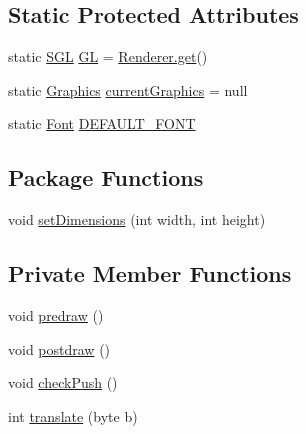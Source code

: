 \subsection*{Static Protected Attributes}
\begin{DoxyCompactItemize}
\item 
static \mbox{\hyperlink{interfaceorg_1_1newdawn_1_1slick_1_1opengl_1_1renderer_1_1_s_g_l}{S\+GL}} \mbox{\hyperlink{classorg_1_1newdawn_1_1slick_1_1_graphics_a39ca68db81b225982a4421c4a6835eed}{GL}} = \mbox{\hyperlink{classorg_1_1newdawn_1_1slick_1_1opengl_1_1renderer_1_1_renderer_abe742c3a7dfca67c6c01821d27087308}{Renderer.\+get}}()
\item 
static \mbox{\hyperlink{classorg_1_1newdawn_1_1slick_1_1_graphics}{Graphics}} \mbox{\hyperlink{classorg_1_1newdawn_1_1slick_1_1_graphics_aededc15e0b8a4b7f0b9b6dc9ba263251}{current\+Graphics}} = null
\item 
static \mbox{\hyperlink{interfaceorg_1_1newdawn_1_1slick_1_1_font}{Font}} \mbox{\hyperlink{classorg_1_1newdawn_1_1slick_1_1_graphics_a5012bdee04bc821457bcc5fdcd23c5c6}{D\+E\+F\+A\+U\+L\+T\+\_\+\+F\+O\+NT}}
\end{DoxyCompactItemize}
\subsection*{Package Functions}
\begin{DoxyCompactItemize}
\item 
void \mbox{\hyperlink{classorg_1_1newdawn_1_1slick_1_1_graphics_a0e154c1ece7603367974df28f2e38a62}{set\+Dimensions}} (int width, int height)
\end{DoxyCompactItemize}
\subsection*{Private Member Functions}
\begin{DoxyCompactItemize}
\item 
void \mbox{\hyperlink{classorg_1_1newdawn_1_1slick_1_1_graphics_a7b4c203181e3b6302d51ed9b24596b8d}{predraw}} ()
\item 
void \mbox{\hyperlink{classorg_1_1newdawn_1_1slick_1_1_graphics_abe054371d1486618ff327bbbcf02ff97}{postdraw}} ()
\item 
void \mbox{\hyperlink{classorg_1_1newdawn_1_1slick_1_1_graphics_a58dfa60d60ec7f56b17e420458b3724e}{check\+Push}} ()
\item 
int \mbox{\hyperlink{classorg_1_1newdawn_1_1slick_1_1_graphics_a83b55b8d458c49ea67ae7367efdbbf69}{translate}} (byte b)
\end{DoxyCompactItemize}
